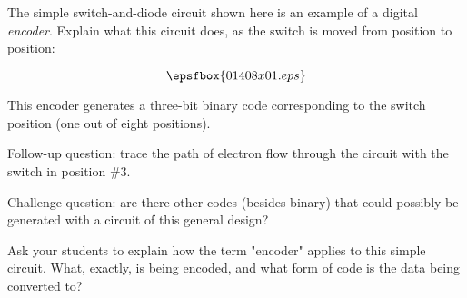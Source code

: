 

The simple switch-and-diode circuit shown here is an example of a digital {\it encoder}.  Explain what this circuit does, as the switch is moved from position to position:

$$\epsfbox{01408x01.eps}$$







This encoder generates a three-bit binary code corresponding to the switch position (one out of eight positions).

\vskip 10pt

Follow-up question: trace the path of electron flow through the circuit with the switch in position \#3.

\vskip 10pt

Challenge question: are there other codes (besides binary) that could possibly be generated with a circuit of this general design?







Ask your students to explain how the term "encoder" applies to this simple circuit.  What, exactly, is being encoded, and what form of code is the data being converted to?




